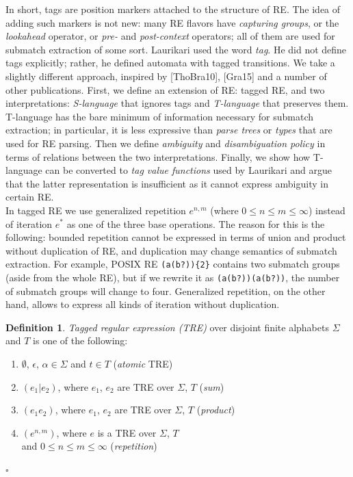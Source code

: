 \documentclass{article}
\newcommand{\Xin}{\!\in\!}
\theoremstyle{definition}
\newtheorem{Xdef}{Definition}
\begin{document}
\begin{multicols}{2}
In short, tags are position markers attached to the structure of RE.
The idea of adding such markers is not new:
many RE flavors have \emph{capturing groups}, or the \emph{lookahead} operator, or \emph{pre-} and \emph{post-context} operators;
all of them are used for submatch extraction of some sort.
Laurikari used the word \emph{tag}.
He did not define tags explicitly; rather, he defined automata with tagged transitions.
We take a slightly different approach, inspired by [ThoBra10], [Gra15] and a number of other publications.
First, we define an extension of RE: tagged RE,
and two interpretations: \emph{S-language} that ignores tags and \emph{T-language} that preserves them.
T-language has the bare minimum of information necessary for submatch extraction;
in particular, it is less expressive than \emph{parse trees} or \emph{types} that are used for RE parsing.
Then we define \emph{ambiguity} and \emph{disambiguation policy} in terms of relations between the two interpretations.
Finally, we show how T-language can be converted to \emph{tag value functions} used by Laurikari
and argue that the latter representation is insufficient as it cannot express ambiguity in certain RE.
\\

In tagged RE we use generalized repetition $e^{n,m}$ (where $0 \!\leq\! n \!\leq\! m \!\leq\! \infty$)
instead of iteration $e^*$ as one of the three base operations.
The reason for this is the following:
bounded repetition cannot be expressed in terms of union and product without duplication of RE,
and duplication may change semantics of submatch extraction.
For example, POSIX RE \texttt{(a(b?))\{2\}} contains two submatch groups (aside from the whole RE),
but if we rewrite it as \texttt{(a(b?))(a(b?))}, the number of submatch groups will change to four.
Generalized repetition, on the other hand, allows to express all kinds of iteration without duplication.
\\

    \begin{Xdef}\label{tre}
    \emph{Tagged regular expression (TRE)} over disjoint finite alphabets $\Sigma$ and $T$ is one of the following:
    \begin{enumerate}
        \medskip
        \item[] $\emptyset$, $\epsilon$, $\alpha \Xin \Sigma$ and $t \Xin T$ (\emph{atomic} TRE)
        \item[] $(e_1 | e_2)$, where $e_1$, $e_2$ are TRE over $\Sigma$, $T$ (\emph{sum})
        \item[] $(e_1 e_2)$,   where $e_1$, $e_2$ are TRE over $\Sigma$, $T$ (\emph{product})
        \item[] $(e^{n,m})$,   where $e$ is a TRE over $\Sigma$, $T$ \\
            \hphantom{\qquad} and $0 \!\leq\! n \!\leq\! m \!\leq\! \infty$ (\emph{repetition})
        \medskip
    \end{enumerate}
    $\square$
    \end{Xdef}


\end{multicols}
\end{document}
